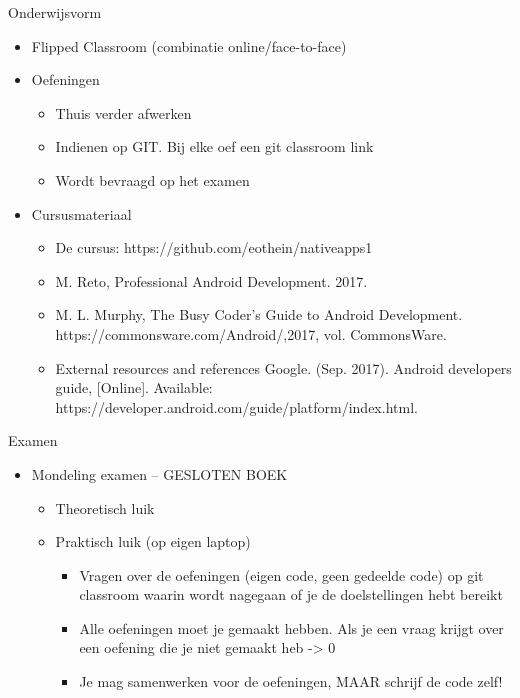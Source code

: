 \documentclass{beamer}
\begin{document}
\begin{frame}{Onderwijsvorm}
\begin{itemize}
	\item Flipped Classroom (combinatie online/face-to-face)
	\item Oefeningen
	\begin{itemize}
	\item Thuis verder afwerken
	\item Indienen op GIT. Bij elke oef een git classroom link
	\item Wordt bevraagd op het examen
\end{itemize}

	\item Cursusmateriaal
	\begin{itemize}
		\item De cursus: https://github.com/eothein/nativeapps1
		\item M. Reto, Professional Android Development. 2017.
		\item 	M. L. Murphy, The Busy Coder’s Guide to Android Development. https://commonsware.com/Android/,2017, vol. CommonsWare.
		
		\item External resources and references Google. (Sep. 2017). Android developers guide, [Online]. Available: https://developer.android.com/guide/platform/index.html.
		
	\end{itemize}
\end{itemize}

\end{frame}

\begin{frame}{Examen}
\begin{itemize}
	\item Mondeling examen – GESLOTEN BOEK
	\begin{itemize}
	\item Theoretisch luik 
	\item Praktisch luik (op eigen laptop)
	\begin{itemize}
	\item Vragen over de oefeningen (eigen code, geen gedeelde code) op git classroom waarin wordt nagegaan of je de doelstellingen hebt bereikt 
	\item Alle oefeningen moet je gemaakt hebben. Als je een vraag krijgt over een oefening die je niet gemaakt heb -> 0
	\item Je mag samenwerken voor de oefeningen, MAAR schrijf de code zelf!\\
		\end{itemize}
		\end{itemize}
		\end{itemize}
\end{frame}
\end{document}
